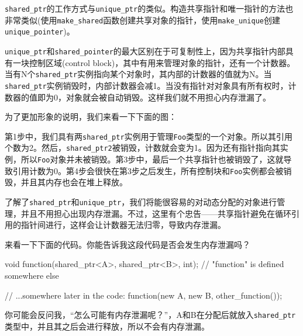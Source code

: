 \begin{enumerate}

\end{enumerate}


\texttt{shared\_ptr}的工作方式与\texttt{unique\_ptr}的类似。构造共享指针和唯一指针的方法也非常类似(使用\texttt{make\_shared}函数创建共享对象的指针，使用\texttt{make\_unique}创建\texttt{unique\_pointer})。

\texttt{unique\_ptr}和\texttt{shared\_pointer}的最大区别在于可复制性上，因为共享指针内部具有一块控制区域(control block)，其中有用来管理对象的指针，还有一个计数器。当有N个\texttt{shared\_ptr}实例指向某个对象时，其内部的计数器的值就为N。当\texttt{shared\_ptr}实例销毁时，内部计数器会减1。当没有指针对对象具有所有权时，计数器的值即为0，对象就会被自动销毁。这样我们就不用担心内存泄漏了。

为了更加形象的说明，我们来看一下下面的图：


第1步中，我们具有两\texttt{shared\_ptr}实例用于管理\texttt{Foo}类型的一个对象。所以其引用个数为2。然后，\texttt{shared\_ptr2}被销毁，计数就会变为1。因为还有指针指向其实例，所以\texttt{Foo}对象并未被销毁。第3步中，最后一个共享指针也被销毁了，这就导致引用计数为0。第4步会很快在第3步之后发生，所有控制块和\texttt{Foo}实例都会被销毁，并且其内存也会在堆上释放。

了解了\texttt{shared\_ptr}和\texttt{unique\_ptr}，我们将能很容易的对动态分配的对象进行管理，并且不用担心出现内存泄漏。不过，这里有个忠告——共享指针避免在循环引用的指针间进行，这样会让计数器无法归零，导致内存泄漏。


来看一下下面的代码。你能告诉我这段代码是否会发生内存泄漏吗？

\begin{codebox}[cpp]
void function(shared_ptr<A>, shared_ptr<B>, int);
// "function" is defined somewhere else

// ...somewhere later in the code:
function(new A{}, new B{}, other_function());
\end{codebox}

你可能会反问我，“怎么可能有内存泄漏呢？”，A和B在分配后就放入\texttt{shared\_ptr}类型中，并且其之后会进行释放，所以不会有内存泄漏。

